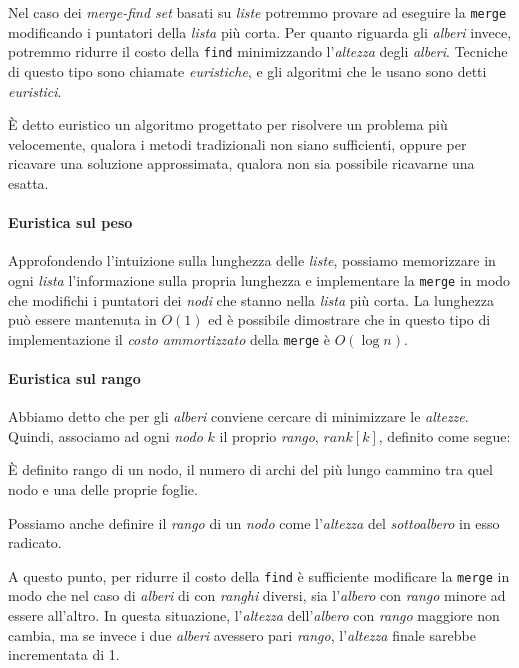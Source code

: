 Nel caso dei \emph{merge-find set} basati su \emph{liste} potremmo provare ad
eseguire la \texttt{merge} modificando i puntatori della \emph{lista} più corta.
Per quanto riguarda gli \emph{alberi} invece, potremmo ridurre il costo della
\texttt{find} minimizzando l'\emph{altezza} degli \emph{alberi}. Tecniche di
questo tipo sono chiamate \emph{euristiche}, e gli algoritmi che le usano sono
detti \emph{euristici}.

\begin{definition}
    È detto euristico un algoritmo progettato per risolvere un problema più
    velocemente, qualora i metodi tradizionali non siano sufficienti, oppure per
    ricavare una soluzione approssimata, qualora non sia possibile ricavarne una
    esatta.
\end{definition}

\paragraph{Euristica sul peso}
Approfondendo l'intuizione sulla lunghezza delle \emph{liste}, possiamo
memorizzare in ogni \emph{lista} l'informazione sulla propria lunghezza e
implementare la \texttt{merge} in modo che modifichi i puntatori dei \emph{nodi}
che stanno nella \emph{lista} più corta. La lunghezza può essere mantenuta in
$O(1)$ ed è possibile dimostrare che in questo tipo di implementazione il
\emph{costo ammortizzato} della \texttt{merge} è $O(\log n)$.

\paragraph{Euristica sul rango}
Abbiamo detto che per gli \emph{alberi} conviene cercare di minimizzare le
\emph{altezze}. Quindi, associamo ad ogni \emph{nodo} $k$ il proprio
\emph{rango}, $rank[k]$, definito come segue:

\begin{definition}
    È definito rango di un nodo, il numero di archi del più lungo cammino tra
    quel nodo e una delle proprie foglie.
\end{definition}
\begin{note}
    Possiamo anche definire il \emph{rango} di un \emph{nodo} come
    l'\emph{altezza} del \emph{sottoalbero} in esso radicato.
\end{note}

\noindent
A questo punto, per ridurre il costo della \texttt{find} è sufficiente
modificare la \texttt{merge} in modo che nel caso di \emph{alberi} di con
\emph{ranghi} diversi, sia l'\emph{albero} con \emph{rango} minore ad essere
 all'altro. In questa situazione, l'\emph{altezza}
dell'\emph{albero} con \emph{rango} maggiore non cambia, ma se invece i due
\emph{alberi} avessero pari \emph{rango}, l'\emph{altezza} finale sarebbe
incrementata di 1.


